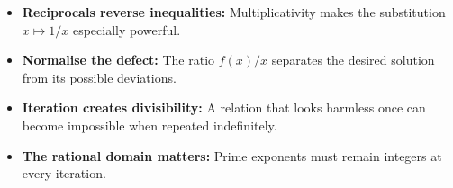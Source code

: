 \begin{takeaways}
\begin{itemize}
\item \textbf{Reciprocals reverse inequalities:} Multiplicativity makes the substitution \(x\mapsto1/x\) especially powerful.
\item \textbf{Normalise the defect:} The ratio \(f(x)/x\) separates the desired solution from its possible deviations.
\item \textbf{Iteration creates divisibility:} A relation that looks harmless once can become impossible when repeated indefinitely.
\item \textbf{The rational domain matters:} Prime exponents must remain integers at every iteration.
\end{itemize}
\end{takeaways}
